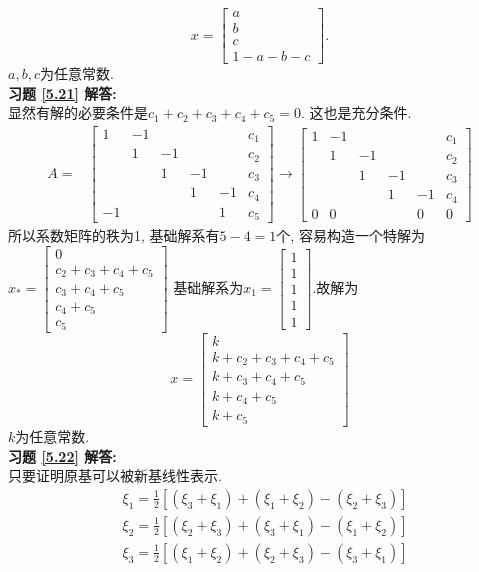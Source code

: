 \documentclass[a4paper]{book}
\begin{document}
$$x=\begin{bmatrix}a\\b\\c\\1-a-b-c\end{bmatrix}.$$
$a,b,c$为任意常数.\\
\textbf{习题 \ref{5.21} 解答:}\\
显然有解的必要条件是$c_1+c_2+c_3+c_4+c_5=0$. 这也是充分条件.
\begin{displaymath}
\begin{aligned}
A=&\begin{bmatrix}  1&-1& & & &c_1\\ &1&-1& & &c_2\\ & &1&-1& &c_3\\ & & &1&-1&c_4\\-1& & & &1&c_5\end{bmatrix}\rightarrow
\begin{bmatrix} 1&-1& & & &c_1\\ &1&-1& & &c_2\\ & &1&-1& &c_3\\ & & &1&-1&c_4\\0&0 & & &0&0    \end{bmatrix} \end{aligned} \end{displaymath}
所以系数矩阵的秩为1, 基础解系有$5-4=1$个, 容易构造一个特解为
$x_{*}=\begin{bmatrix}0\\c_2+c_3+c_4+c_5\\c_3+c_4+c_5\\c_4+c_5\\c_5\end{bmatrix}$
基础解系为$x_1=\begin{bmatrix}1\\1\\1\\1\\1\end{bmatrix}$.故解为
$$x=\begin{bmatrix} k\\k+c_2+c_3+c_4+c_5\\k+c_3+c_4+c_5\\k+c_4+c_5\\k+c_5\end{bmatrix}$$
$k$为任意常数.\\
\textbf{习题 \ref{5.22} 解答:}\\
只要证明原基可以被新基线性表示.
\begin{displaymath}
\begin{aligned}
&\xi_1=\frac{1}{2} [(\xi_3+\xi_1 )+(\xi _1+\xi_2 )-(\xi_2+\xi_3 )]\\
&\xi_2=\frac{1}{2}[(\xi_2+\xi_3 )+(\xi_3+\xi_1 )-(\xi_1+\xi_2 )]\\
&\xi_3=\frac{1}{2} [(\xi_1+\xi_2 )+(\xi_2+\xi_3 )-(\xi_3+\xi_1 )]\end{aligned}\end{displaymath}
\end{document}
